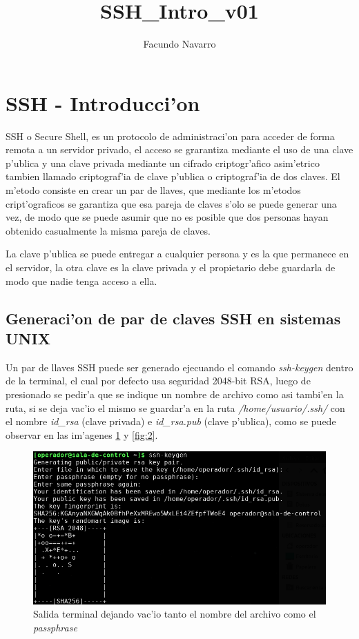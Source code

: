 \documentclass[a4paper]{scrartcl}
\title{SSH\_Intro\_v01}
\author{Facundo Navarro}
\begin{document}

\maketitle
\section{SSH - Introducci'on}
SSH o Secure Shell, es un protocolo de administraci'on para acceder de forma remota a un servidor privado, el acceso se grarantiza mediante el uso de una clave p'ublica y una clave privada mediante un cifrado criptogr'afico asim'etrico tambien llamado criptograf'ia de clave p'ublica o criptograf'ia de dos claves. El m'etodo consiste en crear un par de llaves, que mediante los m'etodos cript'ograficos se garantiza que esa pareja de claves s'olo se puede generar una vez, de modo que se puede asumir que no es posible que dos personas hayan obtenido casualmente la misma pareja de claves.

La clave p'ublica se puede entregar a cualquier persona y es la que permanece en el servidor, la otra clave es la clave privada y el propietario debe guardarla de modo que nadie tenga acceso a ella.

\subsection{Generaci'on de par de claves SSH en sistemas UNIX}
Un par de llaves SSH puede ser generado ejecuando el comando \textit{ssh-keygen} dentro de la terminal, el cual por defecto usa seguridad 2048-bit RSA, luego de presionado se pedir'a que se indique un nombre de archivo como asi tambi'en la ruta, si se deja vac'io el mismo se guardar'a en la ruta \textit{/home/usuario/.ssh/} con el nombre \textit{id\_rsa} (clave privada) e \textit{id\_rsa.pub} (clave p'ublica), como se puede observar en las im'agenes {\color{blue}\ref{fig:1}} y {\color{blue}\ref{fig:2}}.

\begin{figure}[ht]
  \includegraphics[width=\columnwidth]{./ssh_intro_imgs/A}
  \caption{Salida terminal dejando vac'io tanto el nombre del archivo como el \textit{passphrase}}
  \label{fig:1}
\end{figure}
\end{document}
